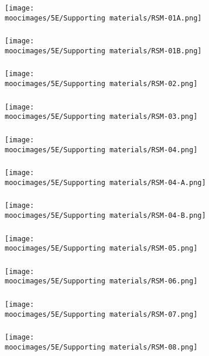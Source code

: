 \documentclass[handout,11pt,aspectratio=169,mathserif]{beamer}
\begin{document}
\begin{frame}\frametitle{}
	\centerline{\texttt{[image: \\moocimages/5E/Supporting materials/RSM-01A.png]}}
\end{frame}
\begin{frame}\frametitle{}
	\centerline{\texttt{[image: \\moocimages/5E/Supporting materials/RSM-01B.png]}}
\end{frame}
\begin{frame}\frametitle{}
	\centerline{\texttt{[image: \\moocimages/5E/Supporting materials/RSM-02.png]}}
\end{frame}
\begin{frame}\frametitle{}
	\centerline{\texttt{[image: \\moocimages/5E/Supporting materials/RSM-03.png]}}
\end{frame}
\begin{frame}\frametitle{}
	\centerline{\texttt{[image: \\moocimages/5E/Supporting materials/RSM-04.png]}}
\end{frame}
\begin{frame}\frametitle{}
	\centerline{\texttt{[image: \\moocimages/5E/Supporting materials/RSM-04-A.png]}}
\end{frame}
\begin{frame}\frametitle{}
	\centerline{\texttt{[image: \\moocimages/5E/Supporting materials/RSM-04-B.png]}}
\end{frame}
\begin{frame}\frametitle{}
	\centerline{\texttt{[image: \\moocimages/5E/Supporting materials/RSM-05.png]}}
\end{frame}
\begin{frame}\frametitle{}
	\centerline{\texttt{[image: \\moocimages/5E/Supporting materials/RSM-06.png]}}
\end{frame}
\begin{frame}\frametitle{}
	\centerline{\texttt{[image: \\moocimages/5E/Supporting materials/RSM-07.png]}}
\end{frame}
\begin{frame}\frametitle{}
	\centerline{\texttt{[image: \\moocimages/5E/Supporting materials/RSM-08.png]}}
\end{frame}
\end{document}
